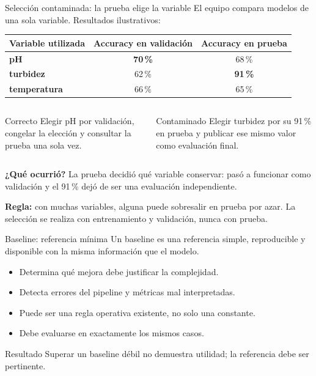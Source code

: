 \documentclass[aspectratio=169,10pt]{beamer}
\begin{document}
\begin{frame}{Selección contaminada: la prueba elige la variable}
  \footnotesize
  El equipo compara modelos de una sola variable. Resultados ilustrativos:

  \medskip
  \begin{tabularx}{\textwidth}{>{\bfseries}X c c}
    \toprule Variable utilizada & Accuracy en validación & Accuracy en prueba \\ \midrule
    pH & \textbf{70\,\%} & 68\,\% \\
    turbidez & 62\,\% & \textbf{91\,\%} \\
    temperatura & 66\,\% & 65\,\% \\
    \bottomrule
  \end{tabularx}

  \medskip
  \begin{columns}[T,onlytextwidth]
    \begin{block}{Correcto}
      Elegir pH por validación, congelar la elección y consultar la prueba una sola vez.
    \end{block}
    \begin{alertblock}{Contaminado}
      Elegir turbidez por su 91\,\% en prueba y publicar ese mismo valor como evaluación final.
    \end{alertblock}
  \end{columns}

  \textbf{¿Qué ocurrió?} La prueba decidió qué variable conservar: pasó a funcionar como validación y el 91\,\% dejó de ser una evaluación independiente.

  \textbf{Regla:} con muchas variables, alguna puede sobresalir en prueba por azar. La selección se realiza con entrenamiento y validación, nunca con prueba.
\end{frame}

\begin{frame}{Baseline: referencia mínima}
  \small
  Un baseline es una referencia simple, reproducible y disponible con la misma información que el modelo.
  \begin{itemize}
    \item Determina qué mejora debe justificar la complejidad.
    \item Detecta errores del pipeline y métricas mal interpretadas.
    \item Puede ser una regla operativa existente, no solo una constante.
    \item Debe evaluarse en exactamente los mismos casos.
  \end{itemize}
  \begin{block}{Resultado}
    Superar un baseline débil no demuestra utilidad; la referencia debe ser pertinente.
  \end{block}
\end{frame}
\end{document}
